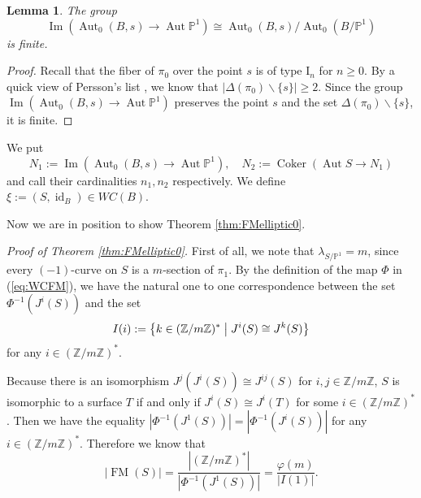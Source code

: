 \documentclass[a4paper,11pt]{article}
\newtheorem{lem}[thm]{Lemma}
\theoremstyle{definition}\newtheorem{defn}[thm]{Definition}
\theoremstyle{remark}\newtheorem{remark}[thm]{Remark}
\numberwithin{equation}{section}
\newcommand{\Aut}{\ensuremath{\operatorname{Aut}}}
\newcommand{\Coker}{\ensuremath{\operatorname{Coker}}}
\newcommand{\Image}{\ensuremath{\operatorname{Im}}}
\newcommand{\id}{\ensuremath{\operatorname{id}}}
\newcommand{\FM}{\operatorname{FM}}
\newcommand{\rom}{\textrm}
\newcommand{\PP}{\mathbb P}
\newcommand{\Z}{\mathbb Z}
\begin{document}
\begin{lem}\label{lem:naka}
The group 
$$
\Image (\Aut _0(B,s)\to \Aut \PP ^1 )
\cong  
\Aut _0(B,s)/\Aut _0(B/\PP ^1)$$
is finite. 
\end{lem}

\begin{proof}
Recall that the fiber of $\pi_0$ over the point $s$ is of 
type $\rom{I}_n$ for $n\ge 0$.
By a quick view of Persson's list \cite{Pe90}, 
we know that $|\Delta (\pi_0)\backslash \{s\}|\ge 2$.   
Since the group 
$
\Image (\Aut _0(B,s)\to \Aut \PP ^1 )
$ 
preserves the point $s$ and the set $\Delta (\pi_0)\backslash \{s\}$,
it is finite. 
\end{proof}

We put 
$$
N_1:=\Image (\Aut _0(B,s)\to \Aut \PP ^1 ), \quad 
N_2:=\Coker (\Aut S\to N_1)
$$
and call their cardinalities
$
n_1,n_2
$
respectively. We define $\xi:=(S,\id _B)\in WC(B)$.
 

Now we are in position to show Theorem \ref{thm:FMelliptic0}.
\newline


\noindent
\emph{Proof of Theorem \ref{thm:FMelliptic0}.}
First of all, we note that $\lambda _{S/\PP^1}=m$, since
every $(-1)$-curve on $S$ is a $m$-section of $\pi_1$.
By the definition of the map $\Phi$ in (\ref{eq:WCFM}), we have
the natural one to one correspondence between the set 
$\Phi^{-1}(J^i(S))$
and the set 
$$
I(i):=\bigl\{k\in (\Z/m\Z)^* \bigm| J^i(S)\cong J^k(S)\bigr\}
$$ 
for any $i\in (\Z/m\Z)^*$. 
%

Because there is an isomorphism $J^j(J^i(S))\cong J^{ij}(S)$
 for $i,j\in \Z/m\Z$, 
$S$ is isomorphic to a surface $T$ if and only if
$J^i(S)\cong J^i(T)$ for some $i\in (\Z/m\Z)^*$. 
Then we have the equality $|\Phi^{-1}(J^1(S))|=|\Phi^{-1}(J^i(S))|$
 for any $i\in (\Z/m\Z)^*$. 
Therefore we know that 
$$
|\FM (S)|=\frac{|(\Z/m\Z)^*|}{|\Phi ^{-1}(J^1(S))|}=\frac{\varphi(m)}{|I(1)|}.
$$
\end{document}
